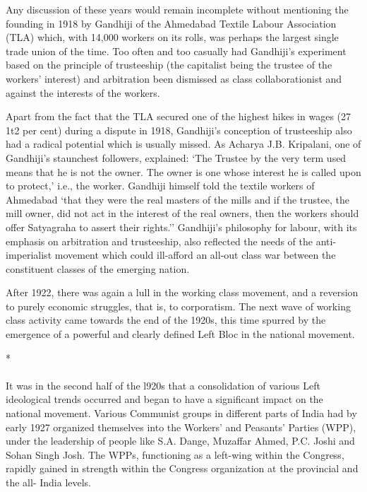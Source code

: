Any discussion of these years would remain incomplete without mentioning the founding in 1918 by Gandhiji of the Ahmedabad Textile Labour Association (TLA) which, with 14,000 workers on its rolls, was perhaps the largest single trade union of the time. Too often and too casually had Gandhiji's experiment based on the principle of trusteeship (the capitalist being the trustee of the workers' interest) and arbitration been dismissed as class collaborationist and against the interests of the workers.

Apart from the fact that the TLA secured one of the highest hikes in wages (27 1t2 per cent) during a dispute in 1918, Gandhiji's conception of trusteeship also had a radical potential which is usually missed. As Acharya J.B. Kripalani, one of Gandhiji's staunchest followers, explained: `The Trustee by the very term used means that he is not the owner. The owner is one whose interest he is called upon to protect,' i.e., the worker. Gandhiji himself told the textile workers of Ahmedabad `that they were the real masters of the mills and if the trustee, the mill owner, did not act in the interest of the real owners, then the workers should offer Satyagraha to assert their rights.'' Gandhiji's philosophy for labour, with its emphasis on arbitration and trusteeship, also reflected the needs of the anti- imperialist movement which could ill-afford an all-out class war between the constituent classes of the emerging nation.

After 1922, there was again a lull in the working class movement, and a reversion to purely economic struggles, that is, to corporatism. The next wave of working class activity came towards the end of the 1920s, this time spurred by the emergence of a powerful and clearly defined Left Bloc in the national movement.

\begin{center}*\end{center}

\paragraph*{}


It was in the second half of the l920s that a consolidation of various Left ideological trends occurred and began to have a significant impact on the national movement. Various Communist groups in different parts of India had by early 1927 organized themselves into the Workers' and Peasants' Parties (WPP), under the leadership of people like S.A. Dange, Muzaffar Ahmed, P.C. Joshi and Sohan Singh Josh. The WPPs, functioning as a left-wing within the Congress, rapidly gained in strength within the Congress organization at the provincial and the all- India levels.

